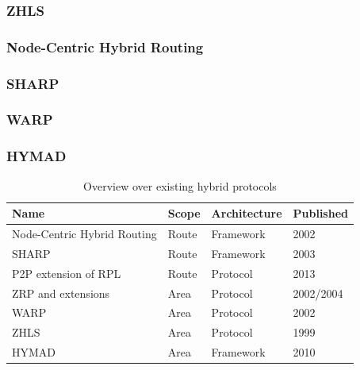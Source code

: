 \documentclass[a4paper,10pt]{scrartcl}
\begin{document}
\subsubsection{\gls{ZHLS}}
\label{subsec:sharp}

\subsubsection{Node-Centric Hybrid Routing}
\label{subsec:existing_protocols}

\subsubsection{\gls{SHARP}}
\label{subsec:sharp}

\subsubsection{\gls{WARP}}
\label{subsec:sharp}

\subsubsection{\gls{HYMAD}}
\label{subsec:sharp}

\begin{table}[t]
    \begin{tabular}{p{}|l|l|l}
        Name & Scope & Architecture & Published \\
        \hline
        Node-Centric Hybrid Routing \cite{Roy_nodecentric} & Route & Framework & 2002 \\
        \gls{SHARP}\cite{SHARP} & Route & Framework & 2003 \\ %
        P2P extension\cite{RFC-6997} of RPL\cite{RFC-6550} & Route & Protocol & 2013\\
        \gls{ZRP} \cite{ZRP-Draft} and extensions \cite{TZRP} \cite{IZR} & Area & Protocol & 2002/2004\\
        \gls{WARP}\cite{WARP} & Area & Protocol & 2002\\
        \gls{ZHLS}\cite{ZHLS} & Area & Protocol & 1999\\
        \gls{HYMAD}\cite{HYMAD} & Area & Framework & 2010\\ %
    \end{tabular}
    \caption{Overview over existing hybrid protocols}
    \label{fig:overview}
\end{table}
\end{document}
